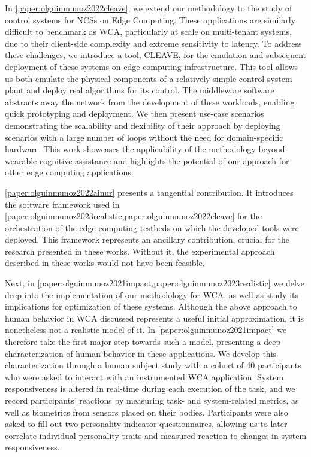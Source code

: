 In \cref{paper:olguinmunoz2022cleave}, we extend our methodology to the study of control systems for \glspl{NCS} on Edge Computing.
These applications are similarly difficult to benchmark as \gls{WCA}, particularly at scale on multi-tenant systems, due to their client-side complexity and extreme sensitivity to latency.
To address these challenges, we introduce a tool, \acs{CLEAVE}, for the emulation and subsequent deployment of these systems on edge computing infrastructure.
This tool allows us both emulate the physical components of a relatively simple control system plant and deploy real algorithms for its control.
The middleware software abstracts away the network from the development of these workloads, enabling quick prototyping and deployment.
We then present use-case scenarios demonstrating the scalability and flexibility of their approach by deploying scenarios with a large number of loops without the need for domain-specific hardware.
This work showcases the applicability of the methodology beyond wearable cognitive assistance and highlights the potential of our approach for other edge computing applications.

\cref{paper:olguinmunoz2022ainur} presents a tangential contribution.
It introduces the software framework used in \cref{paper:olguinmunoz2023realistic,paper:olguinmunoz2022cleave} for the orchestration of the edge computing testbeds on which the developed tools were deployed.
This framework represents an ancillary contribution, crucial for the research presented in these works.
Without it, the experimental approach described in these works would not have been feasible.

Next, in \cref{paper:olguinmunoz2021impact,paper:olguinmunoz2023realistic} we delve deep into the implementation of our methodology for \gls{WCA}, as well as study its implications for optimization of these systems.
Although the above approach to human behavior in \gls{WCA} discussed represents a useful initial approximation, it is nonetheless not a realistic model of it.
In \cref{paper:olguinmunoz2021impact} we therefore take the first major step towards such a model, presenting a deep characterization of human behavior in these applications.
We develop this characterization through a human subject study with a cohort of \num{40} participants who were asked to interact with an instrumented \gls{WCA} application.
System responsiveness is altered in real-time during each execution of the task, and we record participants' reactions by measuring task- and system-related metrics, as well as biometrics from sensors placed on their bodies.
Participants were also asked to fill out two personality indicator questionnaires, allowing us to later correlate individual personality traits and measured reaction to changes in system responsiveness.

